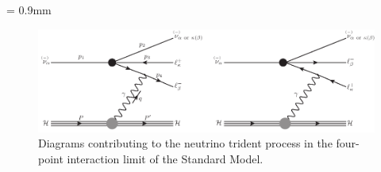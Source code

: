 \unitlength = 0.9mm
\begin{figure}[t]
\centering\includegraphics[width=\textwidth]{tridentSM/figs/SM-trident.pdf}
\caption{Diagrams contributing to the neutrino trident process in the four-point interaction limit of the Standard Model.  
\label{fig:Tdiagrams}}
\end{figure}
